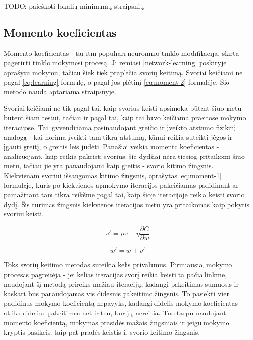 \documentclass{VUMIFPSbakalaurinis}
\newcommand{\TODO}[1]{
\colorbox{todo-background-color}{TODO: #1}
}
\begin{document}
\TODO{paieškoti lokalių minimumų straipsnių}



\subsection{Momento koeficientas}

Momento koeficientas - tai itin populiari neuroninio tinklo modifikacija, skirta pagerinti tinklo mokymosi procesą.
Ji remiasi \ref{network-learning} poskiryje aprašytu mokymu, tačiau šiek tiek praplečia svorių keitimą.
Svoriai keičiami ne pagal \ref{eq:learning} formulę, o pagal jos plėtinį \ref{eq:moment-2} formulėje.
Šio metodo nauda aptariama \cite{1007668} straipsnyje.

Svoriai keičiami ne tik pagal tai, kaip svorius keisti apsimoka būtent šiuo metu būtent šiam testui, tačiau ir pagal tai, kaip tai buvo keičiama praeitose mokymo iteracijose.
Tai įgyvendinama pasinaudojant greičio ir įveikto atstumo fizikinį analogą - kai norima įveikti tam tikrą atstumą, kūnui reikia suteikti jėgos ir įgauti greitį, o greitis leis judėti.
Panašiai veikia momento koeficientas - analizuojant, kaip reikia pakeisti svorius, šie dydžiai nėra tiesiog pritaikomi šiuo metu, tačiau jie yra panaudojami kaip greitis - svorio kitimo žingsnis.
Kiekvienam svoriui išsaugomas kitimo žingsnis, aprašytas \ref{eq:moment-1} formulėje, kuris po kiekvienos apmokymo iteracijos pakeičiamas padidinant ar pamažinant tam tikra reikšme pagal tai, kaip šioje iteracijoje reikia keisti svorio dydį.
Šis turimas žingsnis kiekvienos iteracijos metu yra pritaikomas kaip pokytis svoriui keisti.

\begin{equation} \label{eq:moment-1}
v' = \mu v - \eta \frac{\partial C}{\partial w}
\end{equation}

\begin{equation} \label{eq:moment-2}
w' = w + v'
\end{equation}

Toks svorių keitimo metodas suteikia kelis privalumus.
Pirmiausia, mokymo procesas pagreitėja - jei kelias iteracijas svorį reikia keisti ta pačia linkme, naudojant šį metodą prireiks mažiau iteracijų, kadangi pakeitimas sumuosis ir kaskart bus panaudojamas vis didesnis pakeitimo žingsnis.
To pasiekti vien padidinus mokymo koeficientą nepavyks, kadangi didelis mokymo koeficientas atliks didelius pakeitimus net ir ten, kur jų nereikia.
Tuo tarpu naudojant momento koeficientą, mokymas prasidės mažais žingsniais ir jeigu mokymo kryptis pasikeis, taip pat pradės keistis ir svorio keitimo žingsnis.
\end{document}
